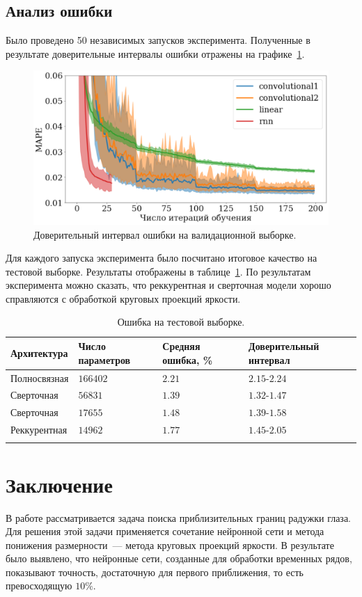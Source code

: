 \documentclass[12pt, twoside]{article}
\begin{document}
\subsection{Анализ ошибки}
Было проведено 50 независимых запусков эксперимента. Полученные в результате доверительные интервалы ошибки отражены на графике~\ref{fig:multerr}.
\begin{figure}[b]
	\centering
	\includegraphics[scale=0.4]{img/multerror.pdf}
	\caption{Доверительный интервал ошибки на валидационной выборке.}
	\label{fig:multerr}
\end{figure}
Для каждого запуска эксперимента было посчитано итоговое качество на тестовой выборке. Результаты отображены в таблице~\ref{table:error}. По результатам эксперимента можно сказать, что реккурентная и сверточная модели хорошо справляются с обработкой круговых проекций яркости.


\begin{longtable}[]{@{}llll@{}}
\toprule
Архитектура & Число параметров & Средняя ошибка, \% & Доверительный интервал\tabularnewline
\midrule
\endhead
Полносвязная & $166402$ & $2.21$ & $2.15$-$2.24$\tabularnewline
Сверточная & $56831$\ & $1.39$ & $1.32$-$1.47$\tabularnewline
Сверточная & $17655$ & $1.48$ & $1.39$-$1.58$\tabularnewline
Реккурентная & $14962$ & $1.77$ & $1.45$-$2.05$\tabularnewline
\bottomrule
\caption{Ошибка на тестовой выборке.}
\label{table:error}
\end{longtable}

\section{Заключение}
В работе рассматривается задача поиска приблизительных границ радужки глаза. Для решения этой задачи применяется сочетание нейронной сети и метода понижения размерности~--- метода круговых проекций яркости. В результате было выявлено, что нейронные сети, созданные для обработки временных рядов, показывают точность, достаточную для первого приближения, то есть превосходящую $10\%$.
\end{document}
